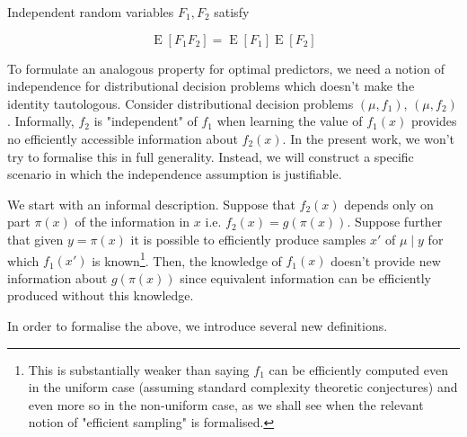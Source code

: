 \documentclass{article}
\numberwithin{equation}{section}
\theoremstyle{definition}
\theoremstyle{plain}
\DeclareMathOperator{\E}{E}
\begin{document}
Independent random variables $F_1, F_2$ satisfy 

\begin{equation}
\label{eqn:ev_mult}
\E[F_1 F_2] = \E[F_1] \E[F_2]
\end{equation}

To formulate an analogous property for optimal predictors, we need a notion of independence for distributional decision problems which doesn't make the identity tautologous. Consider distributional decision problems $(\mu, f_1)$, $(\mu, f_2)$. Informally, $f_2$ is "independent" of $f_1$ when learning the value of $f_1(x)$ provides no efficiently accessible information about $f_2(x)$. In the present work, we won't try to formalise this in full generality. Instead, we will construct a specific scenario in which the independence assumption is justifiable.

We start with an informal description. Suppose that $f_2(x)$ depends only on part $\pi(x)$ of the information in $x$ i.e. $f_2(x) = g(\pi(x))$. Suppose further that given $y=\pi(x)$ it is possible to efficiently produce samples $x'$ of $\mu \mid y$ for which $f_1(x')$ is known\footnote{This is substantially weaker than saying $f_1$ can be efficiently computed even in the uniform case (assuming standard complexity theoretic conjectures) and even more so in the non-uniform case, as we shall see when the relevant notion of "efficient sampling" is formalised.}. Then, the knowledge of $f_1(x)$ doesn't provide new information about $g(\pi(x))$ since equivalent information can be efficiently produced without this knowledge.

In order to formalise the above, we introduce several new definitions.
\end{document}
